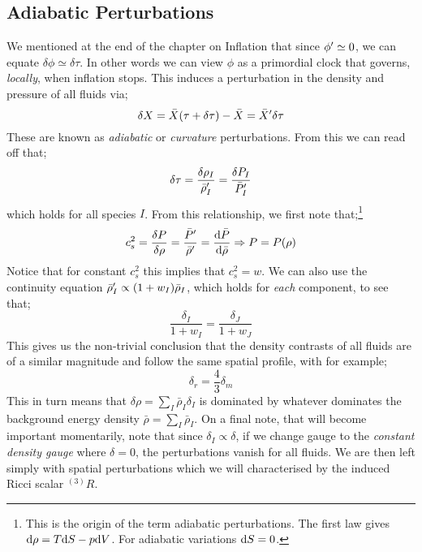 \subsection{Adiabatic Perturbations}
We mentioned at the end of the chapter on Inflation that since $\phi^{\prime} \simeq 0$, we can equate $\delta \phi \simeq \delta \tau$. In other words we can view $\phi$ as a primordial clock that governs, \emph{locally}, when inflation stops. This induces a perturbation in the density and pressure of all fluids via;
\begin{equation}
\delta X = \bar{X}(\tau + \delta \tau) - \bar{X} = \bar{X}^{\prime}\delta \tau
\end{equation}
These are known as \emph{adiabatic} or \emph{curvature} perturbations. From this we can read off that;
\begin{equation}
\delta \tau = \frac{\delta \rho_I}{\bar{\rho}_{I}^{\prime}} = \frac{\delta P_{I}}{\bar{P}_I^{\prime}}
\end{equation}
which holds for all species $I$. From this relationship, we first note that;\footnote{This is the origin of the term adiabatic perturbations. The first law gives $\text{d} \rho = T \text{d} S - p \text{d} V$. For adiabatic variations $\text{d} S = 0$.}
\begin{equation}
c_s^2 = \frac{\delta P}{\delta \rho} = \frac{\bar{P}^{\prime}}{\bar{\rho}^{\prime}} = \frac{\text{d} \bar{P}}{\text{d} \bar{\rho}} \Rightarrow P = P(\rho)
\end{equation}
Notice that for constant $c_s^2$ this implies that $c_s^2 = w$. We can also use the continuity equation $\bar{\rho}_I^{\prime} \propto (1 + w_I)\bar{\rho}_I$, which holds for \emph{each} component, to see that;
\begin{equation}
\frac{\delta_I}{1 + w_I} = \frac{\delta_J}{1 + w_J}
\end{equation}
This gives us the non-trivial conclusion that the density contrasts of all fluids are of a similar magnitude and follow the same spatial profile, with for example;
\begin{equation}
\delta_r = \frac{4}{3}\delta_m
\end{equation}
This in turn means that $\delta \rho = \sum_{I}{\bar{\rho}_I \delta_I}$ is dominated by whatever dominates the background energy density $\bar{\rho} = \sum_{I}{\bar{\rho}_I}$. On a final note, that will become important momentarily, note that since $\delta_I \propto \delta$, if we change gauge to the \emph{constant density gauge} where $\delta = 0$, the perturbations vanish for all fluids. We are then left simply with spatial perturbations which we will characterised by the induced Ricci scalar $^{(3)}R$. 
